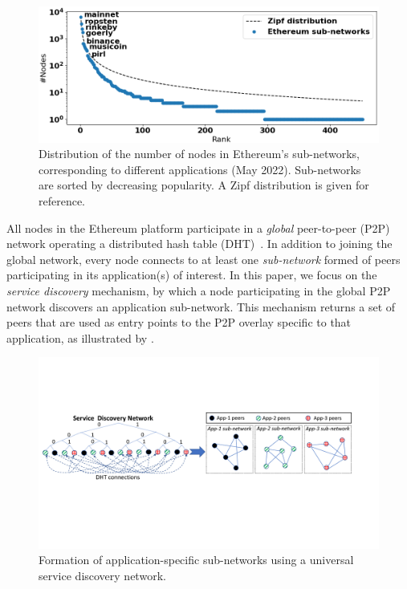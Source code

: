 \begin{figure}[t]
    \includegraphics[width=1\linewidth]{img/ecosystem}
    \vspace{-0.15in}
    \caption{Distribution of the number of nodes in Ethereum's sub-networks, corresponding to different applications (May 2022).
    Sub-networks are sorted by decreasing popularity.
    A Zipf distribution is given for reference.
    }
    \vspace{-0.20in}
    \label{fig:ecosystem}
\end{figure}

All nodes in the Ethereum platform participate in a \emph{global} peer-to-peer (P2P) network operating a distributed hash table (DHT)~\cite{maymounkov2002kademlia}.
In addition to joining the global network, every node connects to at least one \emph{sub-network} formed of peers participating in its application(s) of interest.
In this paper, we focus on the \emph{service discovery} mechanism, by which a node participating in the global P2P network discovers an application sub-network.
This mechanism returns a set of peers that are used as entry points to the P2P overlay specific to that application, as illustrated by .

\begin{figure}[b!]
    \includegraphics[width=1\linewidth]{img/subnetwork}
    \vspace{-0.15in}
    \caption{Formation of application-specific sub-networks using a universal service discovery network.
    }
    \label{fig:subnetwork}
    \vspace{-0.15in}
\end{figure}

